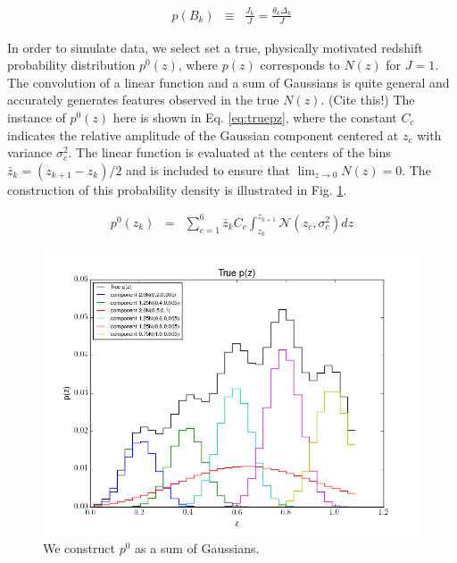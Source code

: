 \documentclass[12pt, onecolumn]{emulateapj}
\begin{document}
\begin{eqnarray}
\label{eq:dparams}
p(B_{k}) &\equiv& \frac{J_{k}}{J} = \frac{\theta_{k}\Delta_{k}}{J}
\end{eqnarray}

In order to simulate data, we select set a true, physically motivated redshift probability distribution $p^{0}(z)$, where $p(z)$ corresponds to $N(z)$ for $J=1$.  The convolution of a linear function and a sum of Gaussians is quite general and accurately generates features observed in the true $N(z)$.  (Cite this!)  The instance of $p^{0}(z)$ here is shown in Eq. \ref{eq:truepz}, where the constant $C_{c}$ indicates the relative amplitude of the Gaussian component centered at $z_{c}$ with variance $\sigma_{c}^{2}$.  The linear function is evaluated at the centers of the bins $\bar{z}_{k}=(z_{k+1}-z_{k})/2$ and is included to ensure that $\lim_{z\to0}N(z)=0$.  The construction of this probability density is illustrated in Fig. \ref{fig:truepz}.  

\begin{eqnarray}
\label{eq:truepz}
p^{0}(z_{k}) &=& \sum_{c=1}^{6}\bar{z}_{k}C_{c}\int_{z_{k}}^{z_{k+1}} \mathcal{N}(z_{c},\sigma^{2}_{c})dz
\end{eqnarray}

\begin{figure}
\label{fig:truepz}
\includegraphics[scale=0.5]{truePz.png}
\caption{We construct $p^{0}$ as a sum of Gaussians.}
\end{figure}
\end{document}
